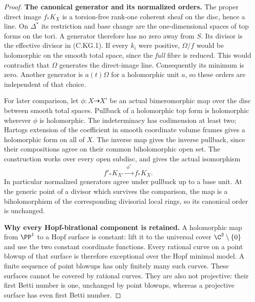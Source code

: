 \begin{proof}
\par\medskip\noindent\textbf{The canonical generator and its normalized orders.}
The proper direct image $f_*K_X$ is a torsion-free
rank-one coherent sheaf on the disc, hence a line.
On $\Delta^*$ its restriction and base change are the
one-dimensional spaces of top forms on the tori.
A generator therefore has no zero away from $S$.
Its divisor is the effective divisor in (C.KG.1).
If every $k_i$ were positive, $\Omega/f$ would be
holomorphic on the smooth total space, since the
\emph{full} fibre is reduced. This would contradict
that $\Omega$ generates the direct-image line.
Consequently its minimum is zero. Another generator
is $a(t)\Omega$ for a holomorphic unit $a$, so these
orders are independent of that choice.

For later comparison, let $\phi:X\dashrightarrow X'$
be an actual bimeromorphic map over the disc between
smooth total spaces. Pullback of a holomorphic top
form is holomorphic wherever $\phi$ is holomorphic.
The indeterminacy has codimension at least two;
Hartogs extension of the coefficient in smooth
coordinate volume frames gives a holomorphic form
on all of $X$. The inverse map gives the inverse
pullback, since their compositions agree on their
common biholomorphic open set. The construction
works over every open subdisc, and gives the actual
isomorphism
\[
                f'_*K_{X'}\xrightarrow{\ \phi^*\ } f_*K_X.
\tag{C.KG.6}
\]
In particular normalized generators agree under
pullback up to a base unit. At the generic point
of a divisor which survives the comparison,
the map is a biholomorphism of the corresponding
divisorial local rings, so its canonical order is
unchanged.

\par\medskip\noindent\textbf{Why every Hopf-birational component is retained.}
A holomorphic map from $\PP^1$ to a Hopf surface
is constant: lift it to the universal cover
$\C^2\setminus\{0\}$ and use the two constant
coordinate functions. Every rational curve on
a point blowup of that surface is therefore
exceptional over the Hopf minimal model. A finite
sequence of point blowups has only finitely many
such curves. These surfaces cannot be covered by
rational curves. They are also not projective:
their first Betti number is one, unchanged by
point blowups, whereas a projective surface has
even first Betti number.


\end{proof}
